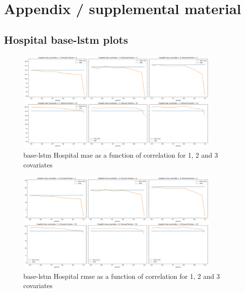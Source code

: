 \documentclass{article}
\begin{document}






\appendix

\section{Appendix / supplemental material}

\subsection{Hospital base-lstm plots}
\begin{figure}[htbp]
\centering
\includegraphics[width=0.9\textwidth]{figures/hospital-base-lstm-mae.png}
\caption{base-lstm Hospital mae as a function of correlation for 1, 2 and 3 covariates}
\label{fig:base_lstm_hospital_mae}
\end{figure}

\begin{figure}[ht]
\centering
\includegraphics[width=0.9\textwidth]{figures/hospital-base-lstm-rmse.png}
\caption{base-lstm Hospital rmse as a function of correlation for 1, 2 and 3 covariates}
\label{fig:base_lstm_hospital_rmse}
\end{figure}
\end{document}
